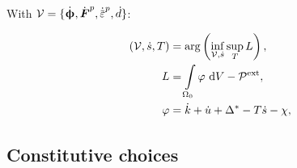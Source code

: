 \begin{frame}
  With $\mathcal{V} = \{ \defrate, \dot{\defgrad}^p, \epdot, \dot{d} \}$:
  \begin{block}{}
    \vspace{-0.5em}
    \begin{align*}
      \left( \mathcal{V}, \dot{s}, T \right) & = \arg \left( \inf_{\mathcal{V}, \dot{s}} \sup_T L \right),        \\
      L                                      & = \int\limits_{\Omega_0} \varphi \text{ d}V - \mathcal{P}^\text{ext}, \\
      \varphi                                & = \dot{k} + \dot{u} + \Delta^* - T\dot{s} - \chi,                  
    \end{align*}
  \end{block}
\end{frame}

\subsection{Constitutive choices}

